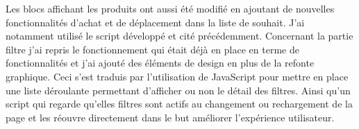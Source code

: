 \documentclass[a4paper,11pt,twoside]{report}
\begin{document}
	Les blocs affichant les produits ont aussi été modifié en ajoutant de nouvelles fonctionnalités d'achat et de déplacement dans la liste de souhait. J'ai notamment utilisé le script développé et cité précédemment. 
	Concernant la partie filtre j'ai repris le fonctionnement qui était déjà en place en terme de fonctionnalités et j'ai ajouté des éléments de design en plus de la refonte graphique. Ceci s'est traduis par l'utilisation de JavaScript pour mettre en place une liste déroulante permettant d'afficher ou non le détail des filtres. Ainsi qu'un script qui regarde qu'elles filtres sont actifs au changement ou rechargement de la page et les réouvre directement dans le but améliorer l'expérience utilisateur. 
	\label{script_accordion_active}
	
\end{document}
